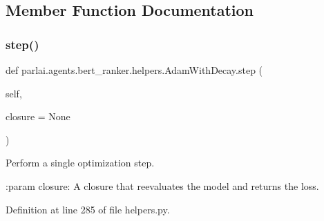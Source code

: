 \subsection{Member Function Documentation}
\mbox{\label{classparlai_1_1agents_1_1bert__ranker_1_1helpers_1_1AdamWithDecay_aeb41188377c1a61b4638228abd6c3e64}} 
\subsubsection{\texorpdfstring{step()}{step()}}
{\footnotesize\ttfamily def parlai.\+agents.\+bert\+\_\+ranker.\+helpers.\+Adam\+With\+Decay.\+step (\begin{DoxyParamCaption}\item[{}]{self,  }\item[{}]{closure = {\ttfamily None} }\end{DoxyParamCaption})}

\begin{DoxyVerb}Perform a single optimization step.

:param closure:
    A closure that reevaluates the model and returns the loss.
\end{DoxyVerb}
 

Definition at line 285 of file helpers.\+py.


